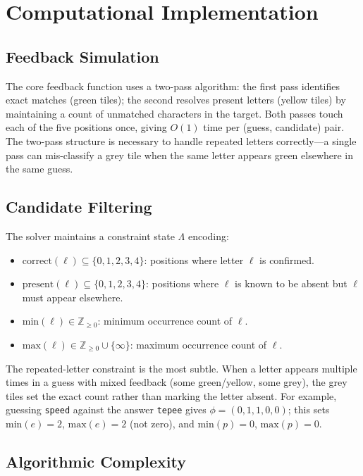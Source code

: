 \documentclass{article}
\begin{document}
\section{Computational Implementation}

\subsection{Feedback Simulation}

The core feedback function uses a two-pass algorithm: the first pass identifies
exact matches (green tiles); the second resolves present letters (yellow tiles)
by maintaining a count of unmatched characters in the target. Both passes touch
each of the five positions once, giving $O(1)$ time per (guess, candidate) pair.
The two-pass structure is necessary to handle repeated letters correctly---a
single pass can mis-classify a grey tile when the same letter appears green
elsewhere in the same guess.

\subsection{Candidate Filtering}

The solver maintains a constraint state $\Lambda$ encoding:

\begin{itemize}
  \item $\text{correct}(\ell) \subseteq \{0,1,2,3,4\}$: positions where letter $\ell$ is confirmed.
  \item $\text{present}(\ell) \subseteq \{0,1,2,3,4\}$: positions where $\ell$ is known to be absent but $\ell$ must appear elsewhere.
  \item $\text{min}(\ell) \in \mathbb{Z}_{\geq 0}$: minimum occurrence count of $\ell$.
  \item $\text{max}(\ell) \in \mathbb{Z}_{\geq 0} \cup \{\infty\}$: maximum occurrence count of $\ell$.
\end{itemize}

The repeated-letter constraint is the most subtle. When a letter appears multiple
times in a guess with mixed feedback (some green/yellow, some grey), the grey
tiles set the exact count rather than marking the letter absent. For example,
guessing \texttt{speed} against the answer \texttt{tepee} gives
$\phi = (0, 1, 1, 0, 0)$; this sets $\text{min}(e) = 2$, $\text{max}(e) = 2$
(not zero), and $\text{min}(p) = 0$, $\text{max}(p) = 0$.

\subsection{Algorithmic Complexity}
\end{document}
